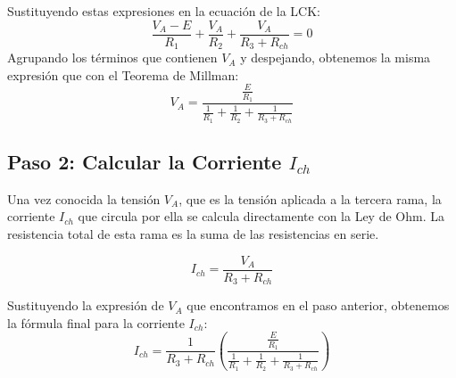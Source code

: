 \documentclass[12pt,a4paper]{article}
\begin{document}
Sustituyendo estas expresiones en la ecuación de la LCK:
\begin{equation}
    \frac{V_A - E}{R_1} + \frac{V_A}{R_2} + \frac{V_A}{R_3 + R_{ch}} = 0
\end{equation}
Agrupando los términos que contienen $V_A$ y despejando, obtenemos la misma expresión que con el Teorema de Millman:
\begin{equation}
    V_A = \frac{\frac{E}{R_1}}{\frac{1}{R_1} + \frac{1}{R_2} + \frac{1}{R_3 + R_{ch}}}
\end{equation}

\subsection{Paso 2: Calcular la Corriente $I_{ch}$}

Una vez conocida la tensión $V_A$, que es la tensión aplicada a la tercera rama, la corriente $I_{ch}$ que circula por ella se calcula directamente con la Ley de Ohm. La resistencia total de esta rama es la suma de las resistencias en serie.

\begin{equation}
    I_{ch} = \frac{V_A}{R_3 + R_{ch}}
\end{equation}

Sustituyendo la expresión de $V_A$ que encontramos en el paso anterior, obtenemos la fórmula final para la corriente $I_{ch}$:
\begin{equation}
    I_{ch} = \frac{1}{R_3 + R_{ch}} \left( \frac{\frac{E}{R_1}}{\frac{1}{R_1} + \frac{1}{R_2} + \frac{1}{R_3 + R_{ch}}} \right)
\end{equation}
\end{document}
